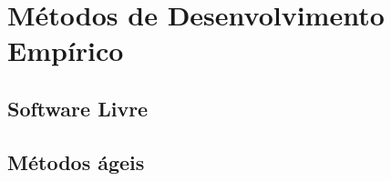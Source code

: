 \chapter{Métodos de Desenvolvimento Empírico}
\label{cap:desenvolvimento-empirico}




\section{Software Livre}


\section{Métodos ágeis}
\label{metodos-ageis}




